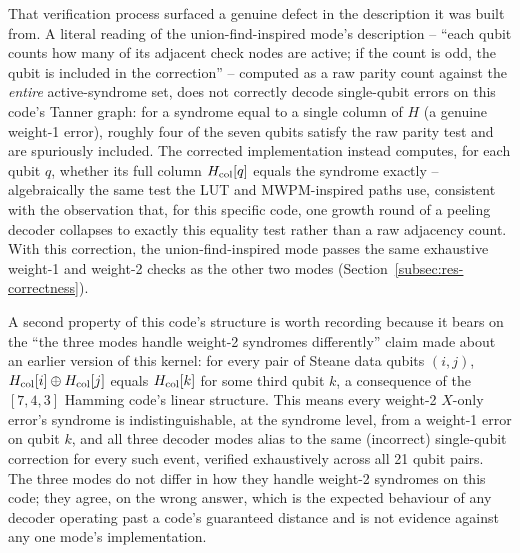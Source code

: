 That verification process surfaced a genuine defect in the description it was built from. A literal reading of the union-find-inspired mode's description -- ``each qubit counts how many of its adjacent check nodes are active; if the count is odd, the qubit is included in the correction'' -- computed as a raw parity count against the \emph{entire} active-syndrome set, does not correctly decode single-qubit errors on this code's Tanner graph: for a syndrome equal to a single column of \(H\) (a genuine weight-1 error), roughly four of the seven qubits satisfy the raw parity test and are spuriously included. The corrected implementation instead computes, for each qubit \(q\), whether its full column \(H_{\rm col}[q]\) equals the syndrome exactly -- algebraically the same test the LUT and MWPM-inspired paths use, consistent with the observation that, for this specific code, one growth round of a peeling decoder collapses to exactly this equality test rather than a raw adjacency count. With this correction, the union-find-inspired mode passes the same exhaustive weight-1 and weight-2 checks as the other two modes (Section~\ref{subsec:res-correctness}).

A second property of this code's structure is worth recording because it bears on the ``the three modes handle weight-2 syndromes differently'' claim made about an earlier version of this kernel: for every pair of Steane data qubits \((i,j)\), \(H_{\rm col}[i]\oplus H_{\rm col}[j]\) equals \(H_{\rm col}[k]\) for some third qubit \(k\), a consequence of the \([7,4,3]\) Hamming code's linear structure. This means every weight-2 \(X\)-only error's syndrome is indistinguishable, at the syndrome level, from a weight-1 error on qubit \(k\), and all three decoder modes alias to the same (incorrect) single-qubit correction for every such event, verified exhaustively across all 21 qubit pairs. The three modes do not differ in how they handle weight-2 syndromes on this code; they agree, on the wrong answer, which is the expected behaviour of any decoder operating past a code's guaranteed distance and is not evidence against any one mode's implementation.
